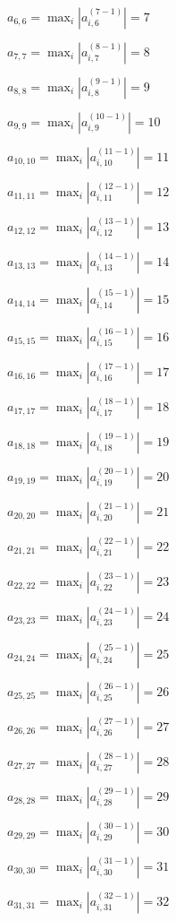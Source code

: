 \documentclass[a4paper,12pt]{article}
\begin{document}
$a _{ 6, 6 } =  \max _i |a _{ i, 6 } ^{ (7 - 1) } | = 7$

$a _{ 7, 7 } =  \max _i |a _{ i, 7 } ^{ (8 - 1) } | = 8$

$a _{ 8, 8 } =  \max _i |a _{ i, 8 } ^{ (9 - 1) } | = 9$

$a _{ 9, 9 } =  \max _i |a _{ i, 9 } ^{ (10 - 1) } | = 10$

$a _{ 10, 10 } =  \max _i |a _{ i, 10 } ^{ (11 - 1) } | = 11$

$a _{ 11, 11 } =  \max _i |a _{ i, 11 } ^{ (12 - 1) } | = 12$

$a _{ 12, 12 } =  \max _i |a _{ i, 12 } ^{ (13 - 1) } | = 13$

$a _{ 13, 13 } =  \max _i |a _{ i, 13 } ^{ (14 - 1) } | = 14$

$a _{ 14, 14 } =  \max _i |a _{ i, 14 } ^{ (15 - 1) } | = 15$

$a _{ 15, 15 } =  \max _i |a _{ i, 15 } ^{ (16 - 1) } | = 16$

$a _{ 16, 16 } =  \max _i |a _{ i, 16 } ^{ (17 - 1) } | = 17$

$a _{ 17, 17 } =  \max _i |a _{ i, 17 } ^{ (18 - 1) } | = 18$

$a _{ 18, 18 } =  \max _i |a _{ i, 18 } ^{ (19 - 1) } | = 19$

$a _{ 19, 19 } =  \max _i |a _{ i, 19 } ^{ (20 - 1) } | = 20$

$a _{ 20, 20 } =  \max _i |a _{ i, 20 } ^{ (21 - 1) } | = 21$

$a _{ 21, 21 } =  \max _i |a _{ i, 21 } ^{ (22 - 1) } | = 22$

$a _{ 22, 22 } =  \max _i |a _{ i, 22 } ^{ (23 - 1) } | = 23$

$a _{ 23, 23 } =  \max _i |a _{ i, 23 } ^{ (24 - 1) } | = 24$

$a _{ 24, 24 } =  \max _i |a _{ i, 24 } ^{ (25 - 1) } | = 25$

$a _{ 25, 25 } =  \max _i |a _{ i, 25 } ^{ (26 - 1) } | = 26$

$a _{ 26, 26 } =  \max _i |a _{ i, 26 } ^{ (27 - 1) } | = 27$

$a _{ 27, 27 } =  \max _i |a _{ i, 27 } ^{ (28 - 1) } | = 28$

$a _{ 28, 28 } =  \max _i |a _{ i, 28 } ^{ (29 - 1) } | = 29$

$a _{ 29, 29 } =  \max _i |a _{ i, 29 } ^{ (30 - 1) } | = 30$

$a _{ 30, 30 } =  \max _i |a _{ i, 30 } ^{ (31 - 1) } | = 31$

$a _{ 31, 31 } =  \max _i |a _{ i, 31 } ^{ (32 - 1) } | = 32$
\end{document}

